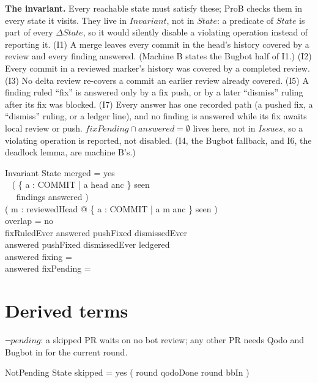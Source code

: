 \documentclass{article}
\begin{document}
\textbf{The invariant.} Every reachable state must satisfy these; ProB checks
them in every state it visits. They live in $Invariant$, not in $State$: a
predicate of $State$ is part of every $\Delta State$, so it would silently
disable a violating operation instead of reporting it.
(I1) A merge leaves every commit in the head's history covered by a review
and every finding answered. (Machine B states the Bugbot half of I1.)
(I2) Every commit in a reviewed marker's history was covered by a completed
review.
(I3) No delta review re-covers a commit an earlier review already covered.
(I5) A finding ruled ``fix'' is answered only by a fix push, or by a later
``dismiss'' ruling after its fix was blocked.
(I7) Every answer has one recorded path (a pushed fix, a ``dismiss'' ruling,
or a ledger line), and no finding is answered while its fix awaits local
review or push. $fixPending \cap answered = \emptyset$ lives here, not in
$Issues$, so a violating operation is reported, not disabled.
(I4, the Bugbot fallback, and I6, the deadlock lemma, are machine B's.)

\begin{schema}{Invariant}
  State
\where
  merged = yes \implies \\
  \quad~ ( \{ a : COMMIT | a \mapsto head \in anc \} \subseteq seen \land \\
  \quad~\quad~ findings \subseteq answered ) \\
  ( \forall m : reviewedHead @ \{ a : COMMIT | a \mapsto m \in anc \} \subseteq seen ) \\
  overlap = no \\
  fixRuledEver \cap answered \subseteq pushFixed \cup dismissedEver \\
  answered \subseteq pushFixed \cup dismissedEver \cup ledgered \\
  answered \cap fixing = \emptyset \\
  answered \cap fixPending = \emptyset
\end{schema}

\section{Derived terms}

$\lnot pending$: a skipped PR waits on no bot review; any other PR needs Qodo
and Bugbot in for the current round.

\begin{schema}{NotPending}
  State
\where
  skipped = yes \lor ( round \in qodoDone \land round \in bbIn )
\end{schema}
\end{document}
